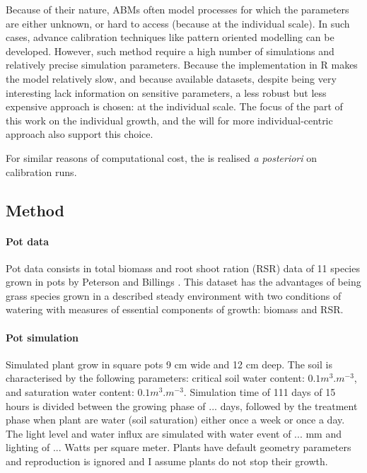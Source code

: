 Because of their nature, ABMs often model processes for which the parameters are either unknown, or hard to access (because at the individual scale). In such cases, advance calibration techniques like pattern oriented modelling\cite{grimm_pattern-oriented_2005, hartig} can be developed. However, such method require a high number of simulations and relatively precise simulation parameters. Because the implementation in R makes the model relatively slow, and because available datasets, despite being very interesting lack information on sensitive parameters, a less robust but less expensive approach is chosen:  at the individual scale. The focus of the part of this work on the individual growth, and the will for more individual-centric approach also support this choice.

 For similar reasons of computational cost, the  is  realised \textit{a posteriori} on calibration runs.

\subsection{Method}

\paragraph{Pot data}
Pot data consists in total biomass and root shoot ration (RSR) data of 11 species grown in pots by Peterson and Billings \cite{peterson_growth_1982}. This dataset has the advantages of being grass species grown in a described steady environment with two conditions of watering with measures of essential components of growth: biomass and RSR.

\paragraph{Pot simulation}
Simulated plant grow in square pots 9 cm wide and 12 cm deep. The soil is characterised by the following parameters: critical soil water content: $0.1 m^3.m^{-3}$, and saturation water content: $0.1 m^3.m^{-3}$. Simulation time of 111 days of 15 hours is divided between the growing phase of ... days, followed by the treatment phase when plant are water (soil saturation) either once a week or once a day. The light level and water influx are simulated with water event of ... mm and lighting of ... Watts per square meter.
Plants have default geometry parameters and reproduction is ignored and I assume plants do not stop their growth.

